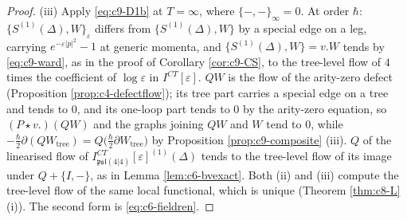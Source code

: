 \begin{proof}
(iii) Apply \eqref{eq:c9-D1b} at $T=\infty$, where $\{-,-\}_\infty=0$. At order $\hbar$: $\{S^{(1)}(\Delta),W\}_\varepsilon$ differs from $\{S^{(1)}(\Delta),W\}$ by a special edge on a leg, carrying $e^{-\varepsilon|p|^2}-1$ at generic momenta, and $\{S^{(1)}(\Delta),W\}=v.W$ tends by \eqref{eq:c9-ward}, as in the proof of Corollary \ref{cor:c9-CS}, to the tree-level flow of $4$ times the coefficient of $\log\varepsilon$ in $I^{CT}[\varepsilon]$. $QW$ is the flow of the arity-zero defect (Proposition \ref{prop:c4-defectflow}); its tree part carries a special edge on a tree and tends to $0$, and its one-loop part tends to $0$ by the arity-zero equation, so $(P\star v.)(QW)$ and the graphs joining $QW$ and $W$ tend to $0$, while $-\tfrac\hbar2\partial(QW_{\mathrm{tree}})=Q\big(\tfrac\hbar2\partial W_{\mathrm{tree}}\big)$ by Proposition \ref{prop:c9-composite} (iii). $Q$ of the linearised flow of $I^{CT}_{\mathfrak{psl}(4|4)}[\varepsilon]^{(1)}(\Delta)$ tends to the tree-level flow of its image under $Q+\{I,-\}$, as in Lemma \ref{lem:c6-bvexact}. Both (ii) and (iii) compute the tree-level flow of the same local functional, which is unique (Theorem \ref{thm:c8-L} (i)). The second form is \eqref{eq:c6-fieldren}.
\end{proof}

